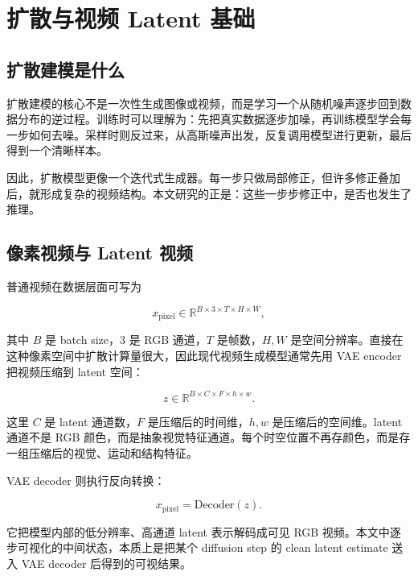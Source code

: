 \section{扩散与视频 Latent 基础}

\subsection{扩散建模是什么}

扩散建模的核心不是一次性生成图像或视频，而是学习一个从随机噪声逐步回到数据分布的逆过程。训练时可以理解为：先把真实数据逐步加噪，再训练模型学会每一步如何去噪。采样时则反过来，从高斯噪声出发，反复调用模型进行更新，最后得到一个清晰样本。

因此，扩散模型更像一个迭代式生成器。每一步只做局部修正，但许多修正叠加后，就形成复杂的视频结构。本文研究的正是：这些一步步修正中，是否也发生了推理。

\subsection{像素视频与 Latent 视频}

普通视频在数据层面可写为

\begin{equation}
    x_{\mathrm{pixel}} \in \mathbb{R}^{B \times 3 \times T \times H \times W},
\end{equation}

其中 $B$ 是 batch size，$3$ 是 RGB 通道，$T$ 是帧数，$H,W$ 是空间分辨率。直接在这种像素空间中扩散计算量很大，因此现代视频生成模型通常先用 VAE encoder 把视频压缩到 latent 空间：

\begin{equation}
    z \in \mathbb{R}^{B \times C \times F \times h \times w}.
\end{equation}

这里 $C$ 是 latent 通道数，$F$ 是压缩后的时间维，$h,w$ 是压缩后的空间维。latent 通道不是 RGB 颜色，而是抽象视觉特征通道。每个时空位置不再存颜色，而是存一组压缩后的视觉、运动和结构特征。

VAE decoder 则执行反向转换：

\begin{equation}
    x_{\mathrm{pixel}} = \mathrm{Decoder}(z).
\end{equation}

它把模型内部的低分辨率、高通道 latent 表示解码成可见 RGB 视频。本文中逐步可视化的中间状态，本质上是把某个 diffusion step 的 clean latent estimate 送入 VAE decoder 后得到的可视结果。

